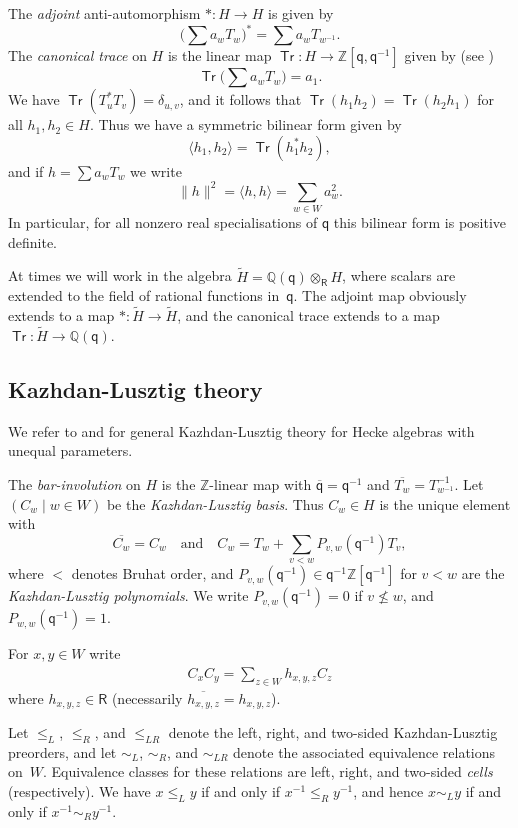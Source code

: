 \documentclass[11pt]{article}
\theoremstyle{plain}
\theoremstyle{definition}
\numberwithin{equation}{section}
\def\QQ{\mathbb{Q}}
\def\ZZ{\mathbb{Z}}
\DeclareMathOperator\Tr{\mathsf{Tr}}
\def\sR{\mathsf{R}}
\newcommand{\sq}{\mathsf{q}}
\begin{document}
The \textit{adjoint} anti-automorphism $*:H\to H$ is given by
$$
\big(\sum a_wT_w\big)^*=\sum a_wT_{w^{-1}}. 
$$
The \textit{canonical trace} on $H$ is the linear map $\Tr:H\to\ZZ[\sq,\sq^{-1}]$ given by (see \cite{GP:00})
$$
\Tr\big(\sum a_wT_w\big)=a_1. 
$$
We have $\Tr(T_u^*T_v)=\delta_{u,v}$, and it follows that $\Tr(h_1h_2)=\Tr(h_2h_1)$ for all $h_1,h_2\in H$. Thus we have a symmetric bilinear form given by
$$
\langle h_1,h_2\rangle=\Tr(h_1^*h_2),
$$
and if $h=\sum a_wT_w$ we write
$$
\|h\|^2=\langle h,h\rangle=\sum_{w\in W}a_w^2. 
$$
In particular, for all nonzero real specialisations of $\sq$ this bilinear form is positive definite. 

At times we will work in the algebra $\tilde{H}=\QQ(\sq)\otimes_{\sR} H$, where scalars are extended to the field of rational functions in~$\sq$. The adjoint map obviously extends to a map $*:\tilde{H}\to \tilde{H}$, and the canonical trace extends to a map $\Tr:\tilde{H}\to\QQ(\sq)$. 

\subsection{Kazhdan-Lusztig theory}\label{sec:KL}

We refer to \cite{Bon:17} and \cite{Lus:03} for general Kazhdan-Lusztig theory for Hecke algebras with unequal parameters. 

The \textit{bar-involution} on $H$ is the $\ZZ$-linear map with $\overline{\sq}=\sq^{-1}$ and $\overline{T_w}= T_{w^{-1}}^{-1}$. Let $(C_w\mid w\in W)$ be the \textit{Kazhdan-Lusztig basis}. Thus $C_w\in H$ is the unique element with
$$
\overline{C_w}=C_w\quad\text{and}\quad C_w=T_w+\sum_{v<w}P_{v,w}(\sq^{-1})T_v,
$$
where $<$ denotes Bruhat order, and $P_{v,w}(\sq^{-1})\in\sq^{-1}\ZZ[\sq^{-1}]$ for $v<w$ are the \textit{Kazhdan-Lusztig polynomials}. We write $P_{v,w}(\sq^{-1})=0$ if $v\not\leq w$, and $P_{w,w}(\sq^{-1})=1$. 

For $x,y\in W$ write 
\begin{align}\label{eq:h}
C_xC_y=\sum_{z\in W}h_{x,y,z}C_z
\end{align}
where $h_{x,y,z}\in\sR$ (necessarily $\overline{h_{x,y,z}}=h_{x,y,z}$). 

Let $\leq_L$, $\leq_R$, and $\leq_{LR}$ denote the left, right, and two-sided Kazhdan-Lusztig preorders, and let $\sim_L$, $\sim_R$, and $\sim_{LR}$ denote the associated equivalence relations on~$W$. Equivalence classes for these relations are left, right, and two-sided \textit{cells} (respectively). We have $x\leq_L y$ if and only if $x^{-1}\leq_R y^{-1}$, and hence $x\sim_L y$ if and only if $x^{-1}\sim_R y^{-1}$. 
\end{document}
